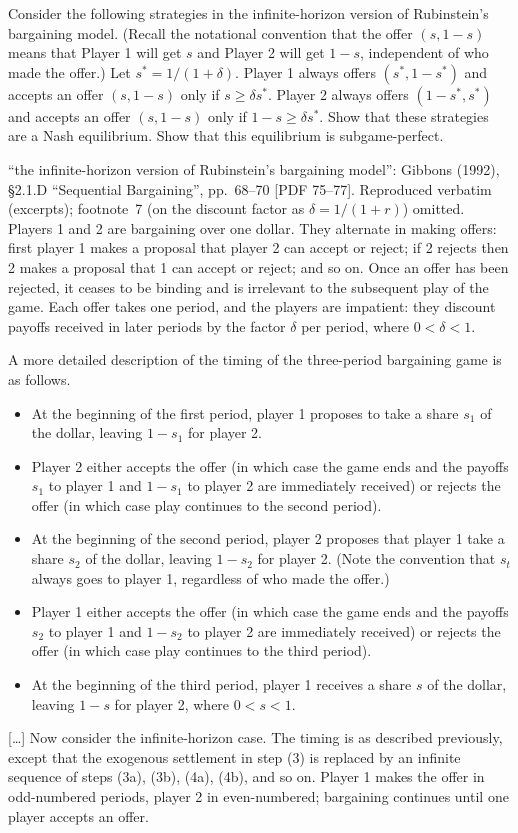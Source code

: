 Consider the following strategies in the infinite-horizon version of Rubinstein's
bargaining model. (Recall the notational convention that the offer $(s, 1 - s)$ means that Player 1
will get $s$ and Player 2 will get $1 - s$, independent of who made the offer.) Let
$s^* = 1/(1 + \delta)$. Player 1 always offers $(s^*, 1 - s^*)$ and accepts an offer $(s, 1 - s)$
only if $s \ge \delta s^*$. Player 2 always offers $(1 - s^*, s^*)$ and accepts an offer
$(s, 1 - s)$ only if $1 - s \ge \delta s^*$. Show that these strategies are a Nash equilibrium.
Show that this equilibrium is subgame-perfect.

\begin{referencia}{``the infinite-horizon version of Rubinstein's bargaining model'': Gibbons (1992),
\S2.1.D ``Sequential Bargaining'', pp.~68--70 [PDF 75--77]. Reproduced verbatim (excerpts); footnote~7
(on the discount factor as $\delta = 1/(1+r)$) omitted.}
Players 1 and 2 are bargaining over one dollar. They alternate in making offers: first player 1
makes a proposal that player 2 can accept or reject; if 2 rejects then 2 makes a proposal that 1 can
accept or reject; and so on. Once an offer has been rejected, it ceases to be binding and is
irrelevant to the subsequent play of the game. Each offer takes one period, and the players are
impatient: they discount payoffs received in later periods by the factor $\delta$ per period, where
$0 < \delta < 1$.

A more detailed description of the timing of the three-period bargaining game is as follows.
\begin{itemize}[leftmargin=2.6em]
\item[(1a)] At the beginning of the first period, player 1 proposes to take a share $s_1$ of the
dollar, leaving $1 - s_1$ for player 2.
\item[(1b)] Player 2 either accepts the offer (in which case the game ends and the payoffs $s_1$ to
player 1 and $1 - s_1$ to player 2 are immediately received) or rejects the offer (in which case
play continues to the second period).
\item[(2a)] At the beginning of the second period, player 2 proposes that player 1 take a share
$s_2$ of the dollar, leaving $1 - s_2$ for player 2. (Note the convention that $s_t$ always goes to
player 1, regardless of who made the offer.)
\item[(2b)] Player 1 either accepts the offer (in which case the game ends and the payoffs $s_2$ to
player 1 and $1 - s_2$ to player 2 are immediately received) or rejects the offer (in which case
play continues to the third period).
\item[(3)] At the beginning of the third period, player 1 receives a share $s$ of the dollar,
leaving $1 - s$ for player 2, where $0 < s < 1$.
\end{itemize}
[\ldots] Now consider the infinite-horizon case. The timing is as described previously, except that
the exogenous settlement in step (3) is replaced by an infinite sequence of steps (3a), (3b), (4a),
(4b), and so on. Player 1 makes the offer in odd-numbered periods, player 2 in even-numbered;
bargaining continues until one player accepts an offer.
\end{referencia}
\resolespaco
